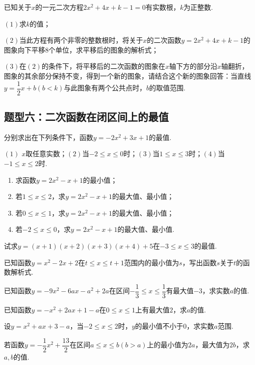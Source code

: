 \documentclass[10pt]{ctexart}
\begin{document}
\begin{jply}{}{}
   已知关于$x$的一元二次方程$2x^2+4x+k-1=0$有实数根，$k$为正整数.
   
   $(1)$求$k$的值；
   
   $(2)$当此方程有两个非零的整数根时，将关于$x$的二次函数$y=2x^2+4x+k-1$的图象向下平移$8$个单位，求平移后的图象的解析式；
   
   $(3)$在$(2)$的条件下，将平移后的二次函数的图象在$x$轴下方的部分沿$x$轴翻折，图象的其余部分保持不变，得到一个新的图象，请结合这个新的图象回答：当直线$y=\dfrac{1}{2}x+b(b<k)$与此图象有两个公共点时，$b$的取值范围.
\end{jply}
\subsection{题型六：二次函数在闭区间上的最值}
\begin{dkyi}{}{}
  分别求出在下列条件下，函数$y=-2x^2+3x+1$的最值.
  
  $(1)$ $x$取任意实数；$(2)$当$-2\leqslant x\leqslant 0$时；$(3)$当$1\leqslant x\leqslant 3$时；$(4)$当$-1\leqslant x\leqslant 2$时.
\end{dkyi}
\begin{jply}{}{}
   \begin{enumerate}[(1)]
   \item 求函数$y=2x^2-x+1$的最小值；
   \item 若$1\leqslant x\leqslant 2$，求$y=2x^2-x+1$的最大值、最小值；
   \item 若$0\leqslant x\leqslant 1$，求$y=2x^2-x+1$的最大值、最小值；
   \item 若$-2\leqslant x\leqslant 0$，求$y=2x^2-x+1$的最大值、最小值.
   \end{enumerate}
\end{jply}
\begin{jply}{}{}
   试求$y=(x+1)(x+2)(x+3)(x+4)+5$在$-3\leqslant x\leqslant 3$的最值.
\end{jply}
\begin{dkyi}{}{}
  已知函数$y=x^2-2x+2$在$t\leqslant x\leqslant t+1$范围内的最小值为$s$，写出函数$s$关于$t$的函数解析式.
\end{dkyi}
\begin{dkyi}{}{}
  已知函数$y=-9x^2-6ax-a^2+2a$在区间$-\dfrac{1}{3}\leqslant x\leqslant \dfrac{1}{3}$有最大值$-3$，求实数$a$的值.
\end{dkyi}
\begin{jply}{}{}
   已知函数$y=-x^2+2ax+1-a$在$0\leqslant x\leqslant 1$上有最大值$2$，求$a$的值.
\end{jply}
\begin{jply}{}{}
   设$y=x^2+ax+3-a$，当$-2\leqslant x\leqslant 2$时，$y$的最小值不小于$0$，求实数$a$范围.
\end{jply}
\begin{jply}{}{}
   若函数$y=-\dfrac{1}{2}x^2+\dfrac{13}{2}$在区间$a\leq x\leq b(b>a)$上的最小值为$2a$，最大值为$2b$，求$a,b$的值.
\end{jply}
\end{document}
